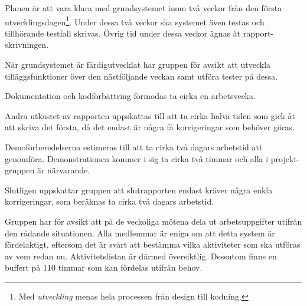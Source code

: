 \documentclass[a4paper]{article}
\begin{document}
Planen är att vara klara med grundsystemet inom två veckor från den första utvecklingsdagen\footnote{Med \textit{utveckling} menas hela processen från design till kodning.}. Under dessa två veckor ska systemet även testas och tillhörande testfall skrivas. Övrig tid under dessa veckor ägnas åt rapport-skrivningen.

När grundsystemet är färdigutvecklat har gruppen för avsikt att utveckla tilläggsfunktioner över den nästföljande veckan samt utföra tester på dessa.

Dokumentation och kodförbättring förmodas ta cirka en arbetsvecka.

Andra utkastet av rapporten uppskattas till att ta cirka halva tiden som gick åt att skriva det första, då det endast är några få korrigeringar som behöver göras.

Demoförberedelserna estimeras till att ta cirka två dagars arbetstid att genomföra. Demonstrationen kommer i sig ta cirka två timmar och alla i projekt-gruppen är närvarande.

Slutligen uppskattar gruppen att slutrapporten endast kräver några enkla korrigeringar, som beräknas ta cirka två dagars arbetstid.

Gruppen har för avsikt att på de veckoliga mötena dela ut arbetsuppgifter utifrån den rådande situationen. Alla medlemmar är eniga om att detta system är fördelaktigt, eftersom det är svårt att bestämma vilka aktiviteter som ska utföras av vem redan nu. Aktivitetslistan är därmed översiktlig. Dessutom finns en buffert på 110 timmar som kan fördelas utifrån behov.
\end{document}

